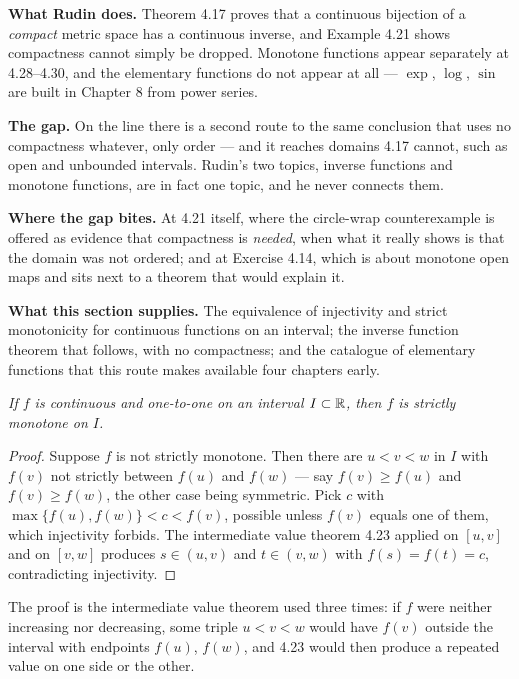 \begin{roadmap}
\raggedright
\textbf{What Rudin does.} Theorem 4.17 proves that a continuous bijection of
a \emph{compact} metric space has a continuous inverse, and Example 4.21
shows compactness cannot simply be dropped. Monotone functions appear
separately at 4.28--4.30, and the elementary functions do not appear at all
--- $\exp$, $\log$, $\sin$ are built in Chapter 8 from power series.

\smallskip
\textbf{The gap.} On the line there is a second route to the same conclusion
that uses no compactness whatever, only order --- and it reaches domains
4.17 cannot, such as open and unbounded intervals. Rudin's two topics,
inverse functions and monotone functions, are in fact one topic, and he never
connects them.

\smallskip
\textbf{Where the gap bites.} At 4.21 itself, where the circle-wrap
counterexample is offered as evidence that compactness is \emph{needed},
when what it really shows is that the domain was not ordered; and at
Exercise 4.14, which is about monotone open maps and sits next to a theorem
that would explain it.

\smallskip
\textbf{What this section supplies.} The equivalence of injectivity and
strict monotonicity for continuous functions on an interval; the inverse
function theorem that follows, with no compactness; and the catalogue of
elementary functions that this route makes available four chapters early.
\end{roadmap}

\emph{If $f$ is continuous and one-to-one on an interval $I \subset \mathbb{R}$, then
$f$ is strictly monotone on $I$.}
\begin{proof}
Suppose $f$ is not strictly monotone. Then there are $u<v<w$ in $I$ with
$f(v)$ not strictly between $f(u)$ and $f(w)$ --- say $f(v) \ge f(u)$ and
$f(v) \ge f(w)$, the other case being symmetric. Pick $c$ with
$\max\{f(u),f(w)\} < c < f(v)$, possible unless $f(v)$ equals one of them,
which injectivity forbids. The intermediate value theorem 4.23 applied on
$[u,v]$ and on $[v,w]$ produces $s \in (u,v)$ and $t \in (v,w)$ with
$f(s)=f(t)=c$, contradicting injectivity.
\end{proof}

\noindent
The proof is the intermediate value theorem used three times: if $f$ were
neither increasing nor decreasing, some triple $u<v<w$ would have $f(v)$
outside the interval with endpoints $f(u)$, $f(w)$, and 4.23 would then
produce a repeated value on one side or the other.

